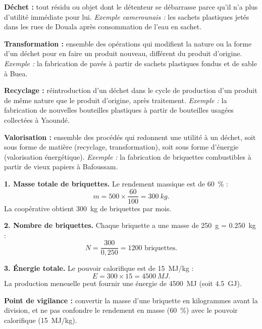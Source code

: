 \documentclass[11pt]{article}
\begin{document}
\begin{corrige}
\textbf{Déchet :} tout résidu ou objet dont le détenteur se débarrasse parce qu'il n'a plus d'utilité immédiate pour lui. \emph{Exemple camerounais :} les sachets plastiques jetés dans les rues de Douala après consommation de l'eau en sachet.

\textbf{Transformation :} ensemble des opérations qui modifient la nature ou la forme d'un déchet pour en faire un produit nouveau, différent du produit d'origine. \emph{Exemple :} la fabrication de pavés à partir de sachets plastiques fondus et de sable à Buea.

\textbf{Recyclage :} réintroduction d'un déchet dans le cycle de production d'un produit de même nature que le produit d'origine, après traitement. \emph{Exemple :} la fabrication de nouvelles bouteilles plastiques à partir de bouteilles usagées collectées à Yaoundé.

\textbf{Valorisation :} ensemble des procédés qui redonnent une utilité à un déchet, soit sous forme de matière (recyclage, transformation), soit sous forme d'énergie (valorisation énergétique). \emph{Exemple :} la fabrication de briquettes combustibles à partir de vieux papiers à Bafoussam.
\end{corrige}

\begin{corrige}
\textbf{1. Masse totale de briquettes.} Le rendement massique est de \SI{60}{\percent} :
\[ m = 500 \times \dfrac{60}{100} = \SI{300}{kg}. \]
La coopérative obtient \SI{300}{kg} de briquettes par mois.

\textbf{2. Nombre de briquettes.} Chaque briquette a une masse de \SI{250}{g} = \SI{0,250}{kg} :
\[ N = \dfrac{300}{0,250} = 1200 \text{ briquettes}. \]

\textbf{3. Énergie totale.} Le pouvoir calorifique est de \SI{15}{MJ/kg} :
\[ E = 300 \times 15 = \SI{4500}{MJ}. \]
La production mensuelle peut fournir une énergie de \SI{4500}{MJ} (soit \SI{4,5}{GJ}).

\textbf{Point de vigilance :} convertir la masse d'une briquette en kilogrammes avant la division, et ne pas confondre le rendement en masse (\SI{60}{\percent}) avec le pouvoir calorifique (\SI{15}{MJ/kg}).
\end{corrige}
\end{document}
